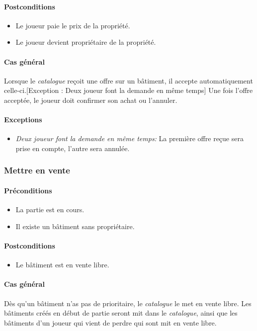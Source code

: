\documentclass[a4paper,11pt]{report}
\begin{document}
\paragraph{Postconditions}
\begin{itemize}
 \item Le joueur paie le prix de la propriété.
 \item Le joueur devient propriétaire de la propriété.
\end{itemize}
\paragraph{Cas général}
Lorsque le \textit{catalogue} reçoit une offre sur un bâtiment, il accepte automatiquement celle-ci.[Exception : Deux joueur font la demande en même temps] Une fois l'offre acceptée, le joueur doit confirmer son achat ou l'annuler.
\paragraph{Exceptions}
\begin{itemize}
 \item \textit{Deux joueur font la demande en même temps:} La première offre reçue sera prise en compte, l'autre sera annulée.
\end{itemize}

\subsubsection{Mettre en vente}
\paragraph{Préconditions}
\begin{itemize}
 \item La partie est en cours.
 \item Il existe un bâtiment sans propriétaire.
\end{itemize}
\paragraph{Postconditions}
\begin{itemize}
 \item Le bâtiment est en vente libre.
\end{itemize}
\paragraph{Cas général}
Dès qu'un bâtiment n'as pas de prioritaire, le \textit{catalogue} le met en vente libre. Les bâtiments créés en début de partie seront mit dans le \textit{catalogue}, ainsi que les bâtiments d'un joueur qui vient de perdre qui sont mit en vente libre.
\end{document}

